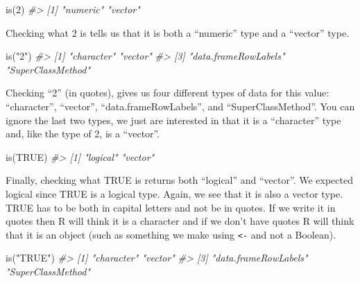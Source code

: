\documentclass[
]{krantz}
\makeatletter
\newenvironment{Shaded}{\begin{snugshade}}{\end{snugshade}}
\newcommand{\CommentTok}[1]{\textcolor[rgb]{0.37,0.37,0.37}{\textit{#1}}}
\newcommand{\ConstantTok}[1]{\textcolor[rgb]{0,0,0}{#1}}
\newcommand{\DecValTok}[1]{\textcolor[rgb]{0.06,0.06,0.06}{#1}}
\newcommand{\FunctionTok}[1]{\textcolor[rgb]{0,0,0}{#1}}
\newcommand{\NormalTok}[1]{#1}
\newcommand{\StringTok}[1]{\textcolor[rgb]{0.5,0.5,0.5}{#1}}
\newenvironment{kframe}{%
\medskip{}
\setlength{\fboxsep}{.8em}
 \def\at@end@of@kframe{}%
 \ifinner\ifhmode%
  \def\at@end@of@kframe{\end{minipage}}%
  \begin{minipage}{\columnwidth}%
 \fi\fi%
 \def\FrameCommand##1{\hskip\@totalleftmargin \hskip-\fboxsep
 \colorbox{shadecolor}{##1}\hskip-\fboxsep
     \hskip-\linewidth \hskip-\@totalleftmargin \hskip\columnwidth}%
 \MakeFramed {\advance\hsize-\width
   \@totalleftmargin\z@ \linewidth\hsize
   \@setminipage}}%
 {\par\unskip\endMakeFramed%
 \at@end@of@kframe}
\renewenvironment{Shaded}{\begin{kframe}}{\end{kframe}}
\makeatother
\begin{document}
\begin{Shaded}
\begin{Highlighting}[]
\FunctionTok{is}\NormalTok{(}\DecValTok{2}\NormalTok{)}
\CommentTok{\#\textgreater{} [1] "numeric" "vector"}
\end{Highlighting}
\end{Shaded}

Checking what 2 is tells us that it is both a ``numeric'' type and a ``vector'' type.

\begin{Shaded}
\begin{Highlighting}[]
\FunctionTok{is}\NormalTok{(}\StringTok{"2"}\NormalTok{)}
\CommentTok{\#\textgreater{} [1] "character"           "vector"             }
\CommentTok{\#\textgreater{} [3] "data.frameRowLabels" "SuperClassMethod"}
\end{Highlighting}
\end{Shaded}

Checking ``2'' (in quotes), gives us four different types of data for this value: ``character'', ``vector'', ``data.frameRowLabels'', and ``SuperClassMethod''. You can ignore the last two types, we just are interested in that it is a ``character'' type and, like the type of 2, is a ``vector''.

\begin{Shaded}
\begin{Highlighting}[]
\FunctionTok{is}\NormalTok{(}\ConstantTok{TRUE}\NormalTok{)}
\CommentTok{\#\textgreater{} [1] "logical" "vector"}
\end{Highlighting}
\end{Shaded}

Finally, checking what TRUE is returns both ``logical'' and ``vector''. We expected logical since TRUE is a logical type. Again, we see that it is also a vector type. TRUE has to be both in capital letters and not be in quotes. If we write it in quotes then R will think it is a character and if we don't have quotes R will think that it is an object (such as something we make using \texttt{\textless{}-} and not a Boolean).

\begin{Shaded}
\begin{Highlighting}[]
\FunctionTok{is}\NormalTok{(}\StringTok{"TRUE"}\NormalTok{)}
\CommentTok{\#\textgreater{} [1] "character"           "vector"             }
\CommentTok{\#\textgreater{} [3] "data.frameRowLabels" "SuperClassMethod"}
\end{Highlighting}
\end{Shaded}
\end{document}
